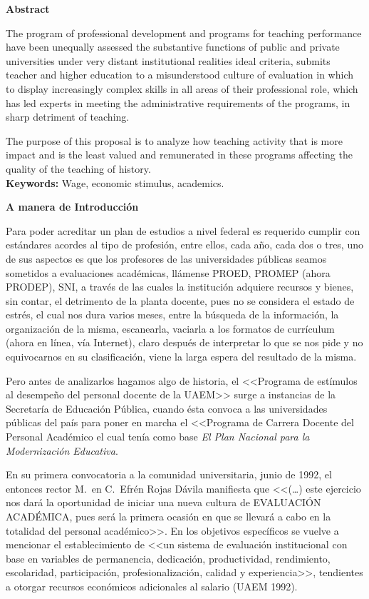 \bigskip
\textbf{Abstract}

The program of professional development and programs for teaching
performance have been unequally assessed the substantive functions of
public and private universities under very distant institutional realities
ideal criteria, submits teacher and higher education to a misunderstood
culture of evaluation in which to display increasingly complex skills in
all areas of their professional role, which has led experts in meeting the
administrative requirements of the programs, in sharp detriment of
teaching. 

The purpose of this proposal is to analyze how teaching activity that is
more impact and is the least valued and remunerated in these programs
affecting the quality of the teaching of history.\\
{\bfseries Keywords:} Wage, economic stimulus, academics.

\bigskip
\textbf{A manera de Introducción}

Para poder acreditar un plan de estudios a nivel federal es requerido
cumplir con estándares acordes al tipo de profesión, entre ellos,  cada
año, cada dos o tres, uno de sus aspectos es que los profesores de las
universidades públicas seamos sometidos a evaluaciones académicas, llámense
PROED, PROMEP (ahora  PRODEP), SNI, a través de las cuales la institución 
adquiere  recursos y bienes, sin contar, el detrimento de la planta
docente, pues no se  considera  el estado de estrés, el cual nos dura
varios meses, entre la búsqueda de la información, la organización de la
misma, escanearla, vaciarla a los formatos de currículum (ahora en línea,
vía Internet), claro después de interpretar lo que se nos pide y no
equivocarnos en su clasificación, viene la larga espera del resultado de la
misma.


Pero antes de analizarlos hagamos algo de historia, el <<Programa de
estímulos al desempeño del personal docente de la UAEM>> surge a instancias
de la Secretaría de Educación Pública, cuando ésta convoca a las
universidades públicas del país para poner en marcha el  <<Programa de
Carrera Docente del Personal Académico el cual  tenía como base \textit{El
Plan Nacional para la Modernización Educativa}.
\newpage

En su primera convocatoria a la comunidad universitaria, junio de 1992, el
entonces rector M.\ en C.\ Efrén Rojas Dávila manifiesta que <<(\ldots) este
ejercicio nos dará  la oportunidad de iniciar una nueva cultura de
EVALUACIÓN ACADÉMICA,  pues será la primera ocasión en que se llevará a
cabo en la totalidad del personal académico>>. En los objetivos específicos
se vuelve  a mencionar el establecimiento de <<un sistema de evaluación
institucional con base en variables de permanencia, dedicación,
productividad, rendimiento, escolaridad, participación, profesionalización,
calidad y experiencia>>, tendientes a otorgar recursos económicos
adicionales al salario (UAEM 1992). 


